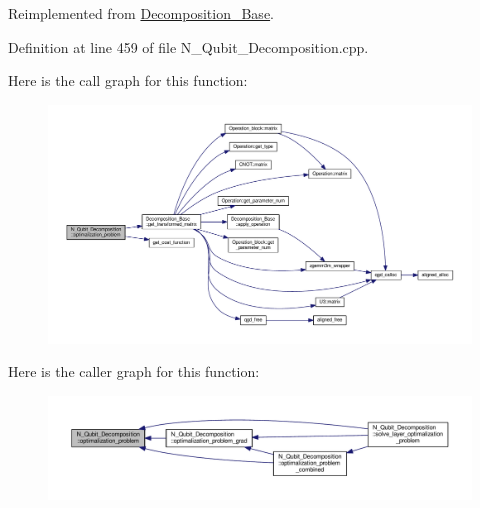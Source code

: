 Reimplemented from \hyperlink{class_decomposition___base_a274b510011ebbc14c8acb67d844a5aef}{Decomposition\+\_\+\+Base}.



Definition at line 459 of file N\+\_\+\+Qubit\+\_\+\+Decomposition.\+cpp.



Here is the call graph for this function\+:
\nopagebreak
\begin{figure}[H]
\begin{center}
\leavevmode
\includegraphics[width=350pt]{class_n___qubit___decomposition_a662b885a5930cd1e53975490ed65ed40_cgraph}
\end{center}
\end{figure}




Here is the caller graph for this function\+:
\nopagebreak
\begin{figure}[H]
\begin{center}
\leavevmode
\includegraphics[width=350pt]{class_n___qubit___decomposition_a662b885a5930cd1e53975490ed65ed40_icgraph}
\end{center}
\end{figure}


